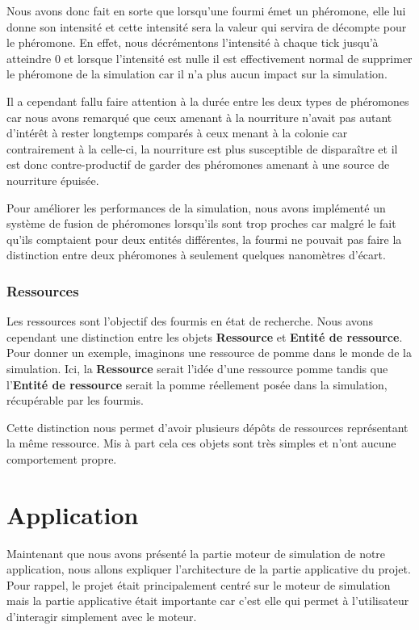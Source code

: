\documentclass{EPUProjetDi}
\begin{document}
Nous avons donc fait en sorte que lorsqu'une fourmi émet un phéromone, elle lui donne son intensité et cette intensité sera la valeur qui servira de décompte
pour le phéromone. En effet, nous décrémentons l'intensité à chaque tick jusqu'à atteindre 0 et lorsque l'intensité est nulle il est effectivement normal 
de supprimer le phéromone de la simulation car il n'a plus aucun impact sur la simulation.

Il a cependant fallu faire attention à la durée entre les deux types de phéromones car nous avons remarqué que ceux amenant à la nourriture n'avait 
pas autant d'intérêt à rester longtemps comparés à ceux menant à la colonie car contrairement à la celle-ci, la nourriture est plus susceptible de 
disparaître et il est donc contre-productif de garder des phéromones amenant à une source de nourriture épuisée.

Pour améliorer les performances de la simulation, nous avons implémenté un système de fusion de phéromones lorsqu'ils sont trop proches car malgré 
le fait qu'ils comptaient pour deux entités différentes, la fourmi ne pouvait pas faire la distinction entre deux phéromones à seulement quelques 
nanomètres d'écart.

\subsubsection{Ressources}

Les ressources sont l'objectif des fourmis en état de recherche. Nous avons cependant une distinction entre les objets \textbf{Ressource} et 
\textbf{Entité de ressource}. Pour donner un exemple, imaginons une ressource de pomme dans le monde de la simulation. Ici, la \textbf{Ressource}
serait l'idée d'une ressource pomme tandis que l'\textbf{Entité de ressource} serait la pomme réellement posée dans la simulation, récupérable par 
les fourmis.

Cette distinction nous permet d'avoir plusieurs dépôts de ressources représentant la même ressource. Mis à part cela ces objets sont très simples
et n'ont aucune comportement propre.

\section{Application}

Maintenant que nous avons présenté la partie moteur de simulation de notre application, nous allons expliquer l'architecture de la partie applicative du projet.
Pour rappel, le projet était principalement centré sur le moteur de simulation mais la partie applicative était importante car c'est elle qui permet à l'utilisateur 
d'interagir simplement avec le moteur. 
\end{document}
